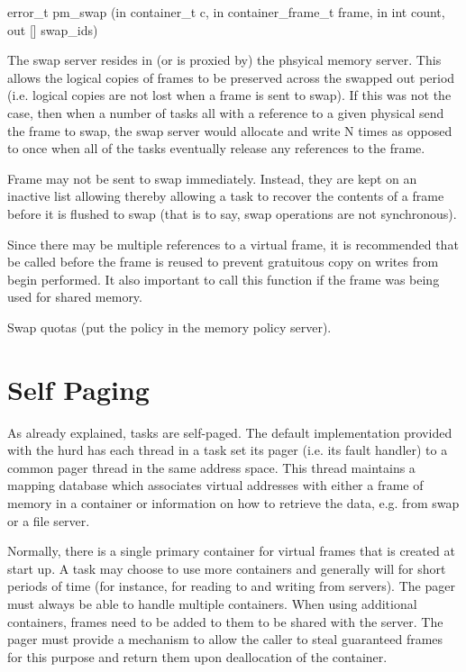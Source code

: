 \begin{code}
error\_t pm\_swap (in container\_t c, in container\_frame\_t frame, in int
count, out [] swap\_ids)
\end{code}

The swap server resides in (or is proxied by) the phsyical memory
server.  This allows the logical copies of frames to be preserved
across the swapped out period (i.e. logical copies are not lost when a
frame is sent to swap).  If this was not the case, then when a number
of tasks all with a reference to a given physical send the frame to
swap, the swap server would allocate and write N times as opposed to
once when all of the tasks eventually release any references to the
frame.

Frame may not be sent to swap immediately.  Instead, they are kept on
an inactive list allowing thereby allowing a task to recover the
contents of a frame before it is flushed to swap (that is to say, swap
operations are not synchronous).

Since there may be multiple references to a virtual frame, it is
recommended that  be called
before the frame is reused to prevent gratuitous copy on writes from
begin performed.  It also important to call this function if the frame
was being used for shared memory.

Swap quotas (put the policy in the memory policy server).

\section{Self Paging}

As already explained, tasks are self-paged.  The default
implementation provided with the hurd has each thread in a task set
its pager (i.e. its fault handler) to a common pager thread in the
same address space.  This thread maintains a mapping database which
associates virtual addresses with either a frame of memory in a
container or information on how to retrieve the data, e.g. from swap
or a file server.

Normally, there is a single primary container for virtual frames that
is created at start up.  A task may choose to use more containers and
generally will for short periods of time (for instance, for reading to
and writing from servers).  The pager must always be able to handle
multiple containers.  When using additional containers, frames need to
be added to them to be shared with the server.  The pager must provide
a mechanism to allow the caller to steal guaranteed frames for this
purpose and return them upon deallocation of the container.

